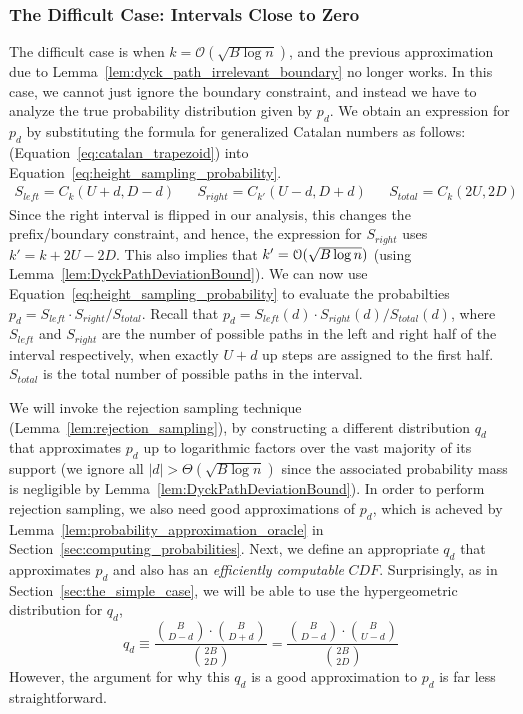 \subsubsection{The Difficult Case: Intervals Close to Zero}
\label{sec:the_difficult_case}
The difficult case is when $k = \mathcal{O}(\sqrt{B\log n})$,
and the previous approximation due to Lemma~\ref{lem:dyck_path_irrelevant_boundary} no longer works.
In this case, we cannot just ignore the boundary constraint, and instead we have to analyze the true probability distribution given by $p_d$.
We obtain an expression for $p_d$ by substituting the formula for generalized Catalan numbers as follows:
(Equation~\ref{eq:catalan_trapezoid}) into Equation~\ref{eq:height_sampling_probability}.
\begin{align}
    S_{left} = C_k(U+d,D-d)
    &&S_{right} = C_{k'}(U-d,D+d)
    &&S_{total} = C_k(2U,2D)
\end{align}
Since the right interval is flipped in our analysis, this changes the prefix/boundary constraint,
and hence, the expression for $S_{right}$ uses $k' = k+2U-2D$.
This also implies that $k' = \Bo(\sqrt{B\log n})$ (using Lemma~\ref{lem:DyckPathDeviationBound}).
We can now use Equation~\ref{eq:height_sampling_probability} to evaluate the probabilties $p_d = S_{left}\cdot S_{right}/S_{total}$.
Recall that $p_d = S_{left}(d)\cdot S_{right}(d)/S_{total}(d)$, where $S_{left}$ and $S_{right}$ are the number of possible paths
in the left and right half of the interval respectively, when exactly $U+d$ up steps are assigned to the first half.
$S_{total}$ is the total number of possible paths in the interval.

We will invoke the rejection sampling technique (Lemma~\ref{lem:rejection_sampling}), by constructing a different distribution $q_d$
that approximates $p_d$ up to logarithmic factors over the vast majority of its support
(we ignore all $|d|>\Theta(\sqrt{B\log n})$ since the associated probability mass is negligible by Lemma~\ref{lem:DyckPathDeviationBound}).
In order to perform rejection sampling, we also need good approximations of $p_d$,
which is acheved by Lemma~\ref{lem:probability_approximation_oracle} in Section~\ref{sec:computing_probabilities}.
Next, we define an appropriate $q_d$ that approximates $p_d$ and also has an \emph{efficiently computable} $CDF$.
Surprisingly, as in Section~\ref{sec:the_simple_case}, we will be able to use the hypergeometric distribution for $q_d$,
\[
q_d \equiv \frac{{B\choose D-d}\cdot{B\choose D+d}}{{2B\choose 2D}} = \frac{{B\choose D-d}\cdot{B\choose U-d}}{{2B\choose 2D}}
\]
However, the argument for why this $q_d$ is a good approximation to $p_d$ is far less straightforward.


